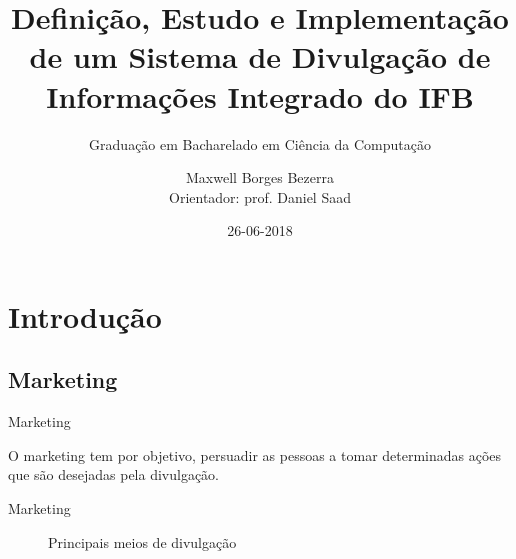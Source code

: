 \documentclass{aula-ifb}
\author{Maxwell Borges Bezerra\\ \small{Orientador: prof. Daniel Saad}}
\title{Definição, Estudo e Implementação de um Sistema de Divulgação de Informações Integrado do IFB}
\subtitle{Graduação em Bacharelado em Ciência da Computação}
\institute{Instituto Federal de Brasília, Câmpus Taguatinga}
\date{26-06-2018}
\begin{document}
\maketitle
\section{Introdução}
\subsection{Marketing}
\begin{frame}{Marketing}
\begin{center}
O marketing tem por objetivo, persuadir as pessoas a tomar determinadas ações que são desejadas pela divulgação.
\end{center}
\end{frame}

\begin{frame}{Marketing}
\begin{figure}[h]
  \centering
  \caption{Principais meios de divulgação}
  \quad %
  \quad %
  \quad %
\label{fig1}
\end{figure}
\end{frame}
\end{document}
